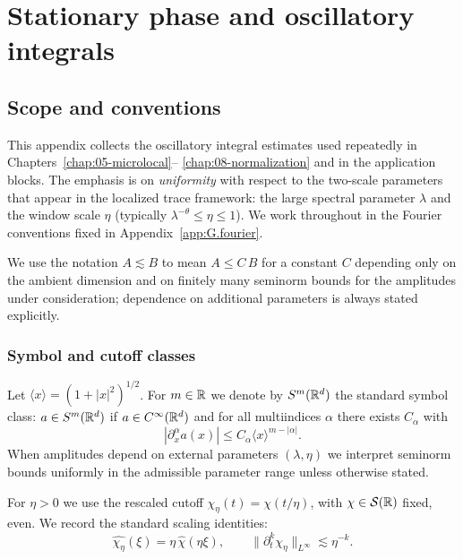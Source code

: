 
\appendix
\chapter{Stationary phase and oscillatory integrals}
\label{app:J.stationary}

\section{Scope and conventions}
\label{sec:J.scope}

This appendix collects the oscillatory integral estimates used repeatedly in Chapters~\ref{chap:05-microlocal}--%
\ref{chap:08-normalization} and in the application blocks.  The emphasis is on \emph{uniformity} with respect to the
two-scale parameters that appear in the localized trace framework: the large spectral parameter $\lambda$ and the
window scale $\eta$ (typically $\lambda^{-\theta}\le \eta\le 1$).  We work throughout in the Fourier conventions fixed
in Appendix~\ref{app:G.fourier}.

We use the notation $A\lesssim B$ to mean $A\le C\,B$ for a constant $C$ depending only on the ambient dimension and
on finitely many seminorm bounds for the amplitudes under consideration; dependence on additional parameters is
always stated explicitly.

\subsection{Symbol and cutoff classes}
\label{subsec:J.symbols}

Let $\langle x\rangle=(1+|x|^2)^{1/2}$.  For $m\in\mathbb{R}$ we denote by $S^m(\mathbb{R}^d)$ the standard symbol class:
$a\in S^m(\mathbb{R}^d)$ if $a\in C^\infty(\mathbb{R}^d)$ and for all multiindices $\alpha$ there exists $C_\alpha$ with
\[
|\partial_x^\alpha a(x)|\le C_\alpha \langle x\rangle^{m-|\alpha|}.
\]
When amplitudes depend on external parameters $(\lambda,\eta)$ we interpret seminorm bounds uniformly in the admissible
parameter range unless otherwise stated.

For $\eta>0$ we use the rescaled cutoff $\chi_\eta(t)=\chi(t/\eta)$, with $\chi\in\mathcal{S}(\mathbb{R})$ fixed, even.
We record the standard scaling identities:
\begin{equation}\label{eq:J.scaling}
\widehat{\chi_\eta}(\xi)=\eta\,\widehat{\chi}(\eta\xi),
\qquad
\|\partial_t^k \chi_\eta\|_{L^\infty}\lesssim \eta^{-k}.
\end{equation}

